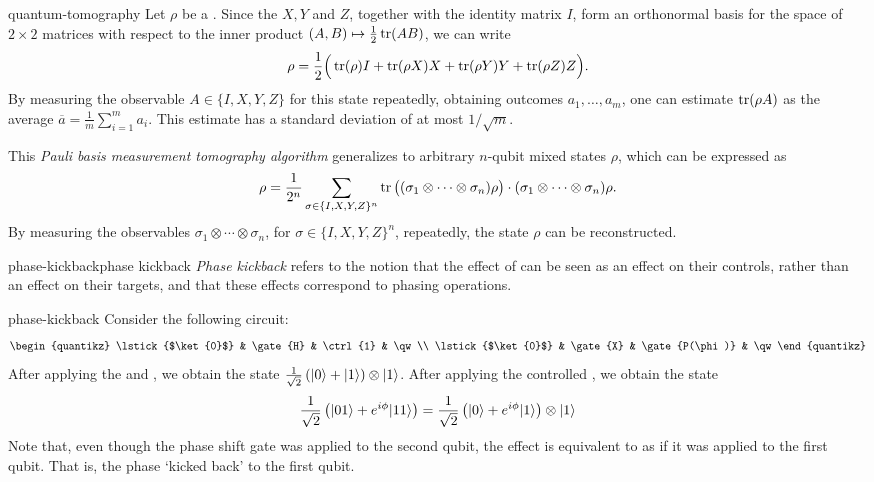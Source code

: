 \begin{example}{quantum-tomography}
    Let $\rho$ be a  . Since the  $X, Y$ and $Z$, together with the identity matrix $I$, form an orthonormal basis for the space of $2 \times 2$ matrices with respect to the inner product $(A, B) \mapsto \tfrac{1}{2} \operatorname{tr}(A B)$, we can write
    \[ \rho = \frac{1}{2} \Big( \operatorname{tr}(\rho) I + \operatorname{tr}(\rho X) X + \operatorname{tr}(\rho Y) Y + \operatorname{tr} (\rho Z) Z \Big) . \]
    By measuring the observable $A \in \{ I, X, Y, Z \}$ for this state repeatedly, obtaining outcomes $a_1, \ldots, a_m$, one can estimate $\operatorname{tr}(\rho A)$ as the average $\overline{a} = \frac{1}{m} \sum_{i = 1}^{m} a_i$. This estimate has a standard deviation of at most $1 / \sqrt{m}$.

    This \textit{Pauli basis measurement tomography algorithm} generalizes to arbitrary $n$-qubit mixed states $\rho$, which can be expressed as
    \[ \rho = \frac{1}{2^n} \sum_{\sigma \in \{ I, X, Y, Z \}^n} \operatorname{tr} \big( (\sigma_1 \otimes \cdots \otimes \sigma_n) \rho \big) \cdot (\sigma_1 \otimes \cdots \otimes \sigma_n) \rho . \]
    By measuring the observables $\sigma_1 \otimes \cdots \otimes \sigma_n$, for $\sigma \in \{ I, X, Y, Z \}^n$, repeatedly, the state $\rho$ can be reconstructed.
\end{example}

\begin{topic}{phase-kickback}{phase kickback}
    \emph{Phase kickback} refers to the notion that the effect of  can be seen as an effect on their controls, rather than an effect on their targets, and that these effects correspond to phasing operations.
\end{topic}

\begin{example}{phase-kickback}
    Consider the following circuit:
    \[ \svg \begin{quantikz}
        \lstick{$\ket{0}$} & \gate{H} & \ctrl{1} & \qw \\
        \lstick{$\ket{0}$} & \gate{X} & \gate{P(\phi)} & \qw
    \end{quantikz} \]
    After applying the  and , we obtain the state $\tfrac{1}{\sqrt{2}} \left( |0\rangle + |1\rangle \right) \otimes |1\rangle$. After applying the controlled , we obtain the state
    \[ \frac{1}{\sqrt{2}} \left( |01\rangle + e^{i \phi} |11\rangle \right) = \frac{1}{\sqrt{2}} \left( |0\rangle + e^{i \phi} |1\rangle \right) \otimes |1\rangle \]
    Note that, even though the phase shift gate was applied to the second qubit, the effect is equivalent to as if it was applied to the first qubit. That is, the phase `kicked back' to the first qubit.
\end{example}

